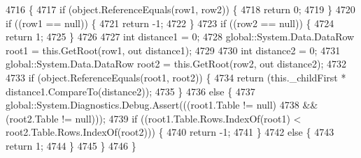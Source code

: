 \begin{DoxyCode}
4716                                                                                                \{
4717                 \textcolor{keywordflow}{if} (\textcolor{keywordtype}{object}.ReferenceEquals(row1, row2)) \{
4718                     \textcolor{keywordflow}{return} 0;
4719                 \}
4720                 \textcolor{keywordflow}{if} ((row1 == null)) \{
4721                     \textcolor{keywordflow}{return} -1;
4722                 \}
4723                 \textcolor{keywordflow}{if} ((row2 == null)) \{
4724                     \textcolor{keywordflow}{return} 1;
4725                 \}
4726 
4727                 \textcolor{keywordtype}{int} distance1 = 0;
4728                 global::System.Data.DataRow root1 = this.GetRoot(row1, out distance1);
4729 
4730                 \textcolor{keywordtype}{int} distance2 = 0;
4731                 global::System.Data.DataRow root2 = this.GetRoot(row2, out distance2);
4732 
4733                 \textcolor{keywordflow}{if} (\textcolor{keywordtype}{object}.ReferenceEquals(root1, root2)) \{
4734                     \textcolor{keywordflow}{return} (this._childFirst * distance1.CompareTo(distance2));
4735                 \}
4736                 \textcolor{keywordflow}{else} \{
4737                     global::System.Diagnostics.Debug.Assert(((root1.Table != null) 
4738                                     && (root2.Table != null)));
4739                     \textcolor{keywordflow}{if} ((root1.Table.Rows.IndexOf(root1) < root2.Table.Rows.IndexOf(root2))) \{
4740                         \textcolor{keywordflow}{return} -1;
4741                     \}
4742                     \textcolor{keywordflow}{else} \{
4743                         \textcolor{keywordflow}{return} 1;
4744                     \}
4745                 \}
4746             \}
\end{DoxyCode}
